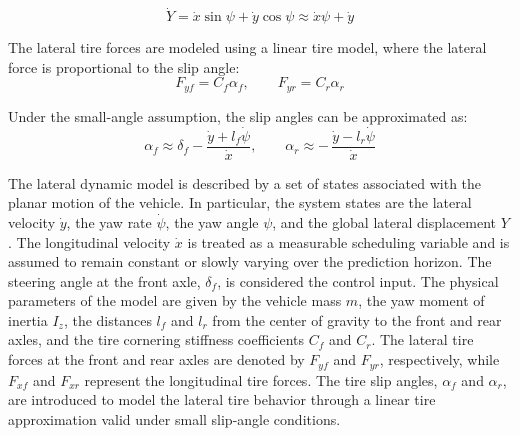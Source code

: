 \documentclass[letterpaper]{ifacconf}
\begin{document}
\begin{equation}
\dot{Y}
=
\dot{x} \sin\psi + \dot{y}\cos\psi
\approx
\dot{x}\psi + \dot{y}
\end{equation}

The lateral tire forces are modeled using a linear tire model, where the lateral force is proportional to the slip angle:
\begin{equation}
F_{yf} = C_f \alpha_f, \qquad F_{yr} = C_r \alpha_r
\end{equation}

Under the small-angle assumption, the slip angles can be approximated as:
\begin{equation}
\alpha_f \approx \delta_f - \frac{\dot{y} + l_f \dot{\psi}}{\dot{x}},
\qquad
\alpha_r \approx -\,\frac{\dot{y} - l_r \dot{\psi}}{\dot{x}}
\end{equation}

The lateral dynamic model is described by a set of states associated with the planar motion of the vehicle. In particular, the system states are the lateral velocity $\dot{y}$, the yaw rate $\dot{\psi}$, the yaw angle $\psi$, and the global lateral displacement $Y$. The longitudinal velocity $\dot{x}$ is treated as a measurable scheduling variable and is assumed to remain constant or slowly varying over the prediction horizon. The steering angle at the front axle, $\delta_f$, is considered the control input. The physical parameters of the model are given by the vehicle mass $m$, the yaw moment of inertia $I_z$, the distances $l_f$ and $l_r$ from the center of gravity to the front and rear axles, and the tire cornering stiffness coefficients $C_f$ and $C_r$. The lateral tire forces at the front and rear axles are denoted by $F_{yf}$ and $F_{yr}$, respectively, while $F_{xf}$ and $F_{xr}$ represent the longitudinal tire forces. The tire slip angles, $\alpha_f$ and $\alpha_r$, are introduced to model the lateral tire behavior through a linear tire approximation valid under small slip-angle conditions.
\end{document}
